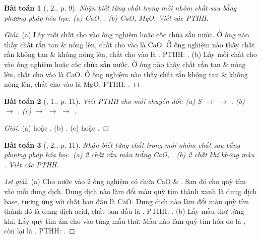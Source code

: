 \documentclass{article}
\newtheorem{baitoan}{Bài toán}
\begin{document}
\begin{baitoan}[\cite{SGK_Hoa_Hoc_9}, 2., p. 9]
	Nhận biết từng chất trong mỗi nhóm chất sau bằng phương pháp hóa học. (a) \emph{CaO, }. (b) \emph{CaO, MgO}. Viết các PTHH.
\end{baitoan}

\begin{proof}[Giải]
	(a) Lấy mỗi chất cho vào ống nghiệm hoặc cốc chứa sẵn nước. Ở ống nào thấy chất rắn tan \& nóng lên, chất cho vào là CaO. Ở ống nghiệm nào thấy chất rắn không tan \& không nóng lên, chất cho vào là . PTHH: . (b) Lấy mỗi chất cho vào ống nghiệm hoặc cốc chứa sẵn nước. Ở ống nào thấy chất rắn tan \& nóng lên, chất cho vào là CaO. Ở ống nghiệm nào thấy chất rắn không tan \& không nóng lên, chất cho vào là MgO. PTHH: .
\end{proof}

\begin{baitoan}[\cite{SGK_Hoa_Hoc_9}, 1., p. 11]
	Viết PTHH cho mỗi chuyển đổi: (a) \emph{S $\to$  $\to$ }. (b) \emph{ $\to$ }. (c) \emph{ $\to$  $\to$  $\to$ }.
\end{baitoan}

\begin{proof}[Giải]
	(a)  hoặc . (b) . (c)  hoặc .
\end{proof}

\begin{baitoan}[\cite{SGK_Hoa_Hoc_9}, 2., p. 11]
	Nhận biết từng chất trong mỗi nhóm chất sau bằng phương pháp hóa học. (a) 2 chất rắn màu trắng \emph{CaO, }. (b) 2 chất khí không màu \emph{}. Viết các PTHH.
\end{baitoan}

\begin{proof}[1st giải]
	(a) Cho nước vào 2 ống nghiệm có chứa CaO \& . Sau đó cho quỳ tím vào mỗi dung dịch. Dung dịch nào làm đổi màu quỳ tím thành xanh là dung dịch base, tương ứng với chất ban đầu là CaO. Dung dịch nào làm đổi màu quỳ tím thành đỏ là dung dịch acid, chất ban đầu là . PTHH: . (b) Lấy mẫu thử từng khí. Lấy quỳ tím ẩm cho vào từng mẫu thử. Mẫu nào làm quỳ tím hóa đỏ là , còn lại là . PTHH: .
\end{proof}
\end{document}
